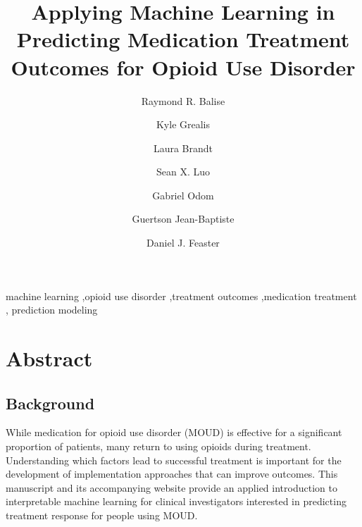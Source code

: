 \documentclass[
  number,
  preprint,
  3p,
  onecolumn]{elsarticle}
\begin{document}
\begin{frontmatter}
\title{Applying Machine Learning in Predicting Medication Treatment
Outcomes for Opioid Use Disorder}
\author[1]{Raymond R. Balise%
%
}
\author[1]{Kyle Grealis%
%
}

\author[2]{Laura Brandt%
%
}

\author[3]{Sean X. Luo%
%
}

\author[2]{Gabriel Odom%
%
}

\author[1]{Guertson Jean-Baptiste%
%
}

\author[1]{Daniel J. Feaster%
%
}










        





\begin{keyword}
    machine learning \sep opioid use disorder \sep treatment
outcomes \sep medication treatment \sep 
    prediction modeling
\end{keyword}
\end{frontmatter}
    

\section{Abstract}\label{abstract}

\subsection{Background}\label{background}

While medication for opioid use disorder (MOUD) is effective for a
significant proportion of patients, many return to using opioids during
treatment. Understanding which factors lead to successful treatment is
important for the development of implementation approaches that can
improve outcomes. This manuscript and its accompanying website provide
an applied introduction to interpretable machine learning for clinical
investigators interested in predicting treatment response for people
using MOUD.
\end{document}
